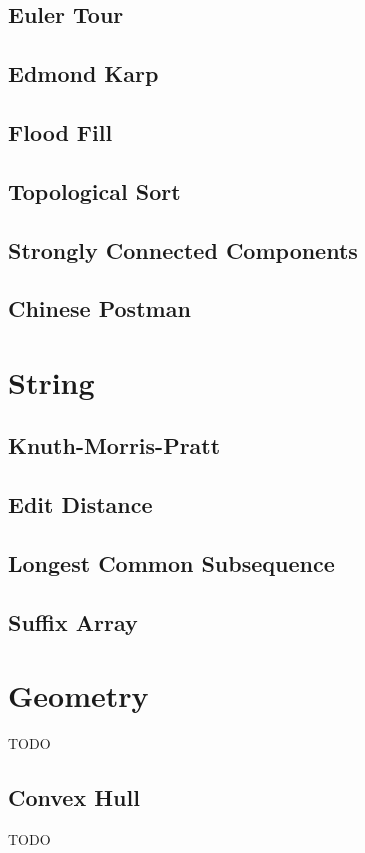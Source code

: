 \documentclass[twocolumn,8pt]{article}
\begin{document}
\subsection{Euler Tour}


\subsection{Edmond Karp}


\subsection{Flood Fill}


\subsection{Topological Sort}


\subsection{Strongly Connected Components}


\subsection{Chinese Postman}



\section{String}

\subsection{Knuth-Morris-Pratt}


\subsection{Edit Distance}


\subsection{Longest Common Subsequence}


\subsection{Suffix Array}


\section{Geometry}

TODO

\subsection{Convex Hull}

TODO
\end{document}
